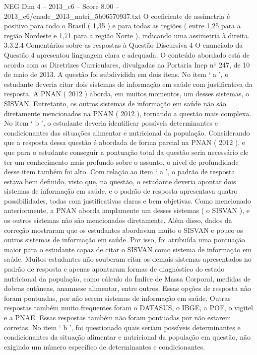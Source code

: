 \begin{textsample}{NEG Dim 4 – 2013\_c6 – Score 8.00 – 2013\_c6/enade\_2013\_nutri\_5b06570937.txt}
O coeficiente de assimetria é positivo para todo o Brasil ( 1,35 ) e para todas as regiões ( entre 1,25 para a região Nordeste e 1,71 para a região Norte ), indicando uma assimetria à direita. 3.3.2.4 Comentários sobre as respostas à Questão Discursiva 4 O enunciado da Questão 4 apresentou linguagem clara e adequada.
O conteúdo abordado está de acordo com as Diretrizes Curriculares, divulgadas na Portaria Inep nº 247, de 10 de maio de 2013.
A questão foi subdividida em dois itens.
No item ‘ a ’, o estudante deveria citar dois sistemas de informação em saúde com justificativa da resposta.
A PNAN ( 2012 ) aborda, em muitos momentos, um desses sistemas, o SISVAN.
Entretanto, os outros sistemas de informação em saúde não são diretamente mencionados na PNAN ( 2012 ), tornando a questão mais complexa.
No item ‘ b ’, o estudante deveria identificar possíveis determinantes e condicionantes das situações alimentar e nutricional da população.
Considerando que a resposta dessa questão é abordada de forma parcial na PNAN ( 2012 ), e que para o estudante conseguir a pontuação total da questão seria necessário ele ter um conhecimento mais profundo sobre o assunto, o nível de profundidade desse item também foi alto.
Com relação ao item ‘ a ’, o padrão de resposta estava bem definido, visto que, na questão, o estudante deveria apontar dois sistemas de informação em saúde, e o padrão de resposta apresentava quatro possibilidades, todas com justificativas claras e bem objetivas.
Como mencionado anteriormente, a PNAN aborda amplamente um desses sistemas ( o SISVAN ), e os outros sistemas não são mencionados diretamente.
Além disso, dados da correção mostraram que os estudantes abordavam muito o SISVAN e pouco os outros sistemas de informação em saúde.
Por isso, foi atribuída uma pontuação maior para o estudante capaz de citar o SISVAN como sistema de informação em saúde.
Muitos estudantes não souberam citar os demais sistemas apresentados no padrão de resposta e apenas apontaram formas de diagnóstico do estado nutricional da população, como cálculo do Índice de Massa Corporal, medidas de dobras cutâneas, anamnese alimentar, entre outros.
Essas opções de resposta não foram pontuadas, por não serem sistemas de informação em saúde.
Outras respostas também muito frequentes foram o DATASUS, o IBGE, a POF, o vigitel e a PNAE.
Essas respostas também não foram pontuadas por não estarem corretas.
No item ‘ b ’, foi questionado quais seriam possíveis determinantes e condicionantes da situação alimentar e nutricional da população em questão, não exigindo um número específico de determinantes e condicionantes.

\end{textsample}
